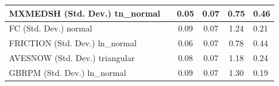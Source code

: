 \begin{table}
\begin{center}
\begin{tabular}{|l|l|c|c|c|l|}
			\hline
			MXMEDSH (Std. Dev.) tn_normal &  & 0.05 & 0.07 & 0.75 & 0.46 \\
			\hline
			FC (Std. Dev.) normal &  & 0.09 & 0.07 & 1.24 & 0.21 \\
			\hline
			FRICTION (Std. Dev.) ln_normal &  & 0.06 & 0.07 & 0.78 & 0.44 \\
			\hline
			AVESNOW (Std. Dev.) triangular &  & 0.08 & 0.07 & 1.18 & 0.24 \\
			\hline
			GBRPM (Std. Dev.) ln_normal &  & 0.09 & 0.07 & 1.30 & 0.19 \\
			\hline
		\end{tabular}
	\end{center}
\end{table}